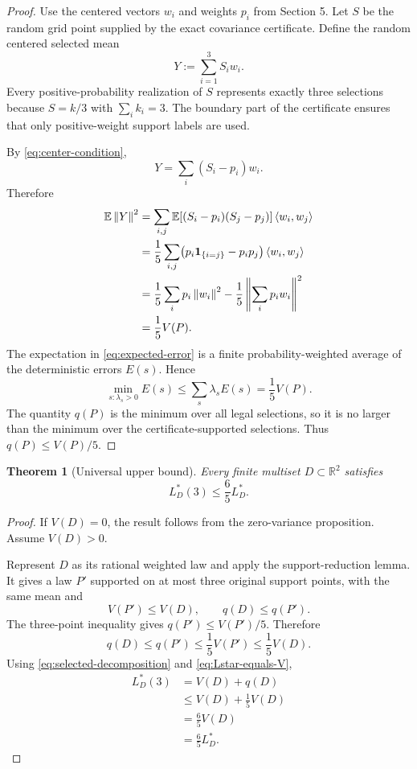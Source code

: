 \documentclass[11pt]{article}
\newtheorem{theorem}{Theorem}[section]
\theoremstyle{definition}
\theoremstyle{remark}
\newcommand{\R}{\mathbb{R}}
\newcommand{\E}{\mathbb{E}}
\newcommand{\ip}[2]{\left\langle #1,#2\right\rangle}
\newcommand{\norm}[1]{\left\lVert #1\right\rVert}
\begin{document}
\begin{proof}
Use the centered vectors $w_i$ and weights $p_i$ from Section 5.  Let $S$ be the random grid point supplied by the exact covariance certificate.  Define the random centered selected mean
\begin{equation}
Y:=\sum_{i=1}^3S_iw_i.
\label{eq:def-Y}
\end{equation}
Every positive-probability realization of $S$ represents exactly three selections because $S=k/3$ with $\sum_i k_i=3$.  The boundary part of the certificate ensures that only positive-weight support labels are used.

By \eqref{eq:center-condition},
\[
Y=\sum_i(S_i-p_i)w_i.
\]
Therefore
\begin{align}
\E\norm{Y}^2
&=\sum_{i,j}
\E[(S_i-p_i)(S_j-p_j)]\ip{w_i}{w_j} \notag\\
&=\frac15\sum_{i,j}
\bigl(p_i\mathbf 1_{\{i=j\}}-p_ip_j\bigr)\ip{w_i}{w_j} \notag\\
&=\frac15\sum_i p_i\norm{w_i}^2
 -\frac15\norm{\sum_i p_iw_i}^2 \notag\\
&=\frac15V(P).
\label{eq:expected-error}
\end{align}
The expectation in \eqref{eq:expected-error} is a finite probability-weighted average of the deterministic errors $E(s)$.  Hence
\[
\min_{s:\lambda_s>0}E(s)
\le\sum_s\lambda_sE(s)
=\frac15V(P).
\]
The quantity $q(P)$ is the minimum over all legal selections, so it is no larger than the minimum over the certificate-supported selections.  Thus $q(P)\le V(P)/5$.
\end{proof}

\begin{theorem}[Universal upper bound]
Every finite multiset $D\subset\R^2$ satisfies
\[
L_D^*(3)\le\frac65L_D^*.
\]
\end{theorem}

\begin{proof}
If $V(D)=0$, the result follows from the zero-variance proposition.  Assume $V(D)>0$.

Represent $D$ as its rational weighted law and apply the support-reduction lemma.  It gives a law $P'$ supported on at most three original support points, with the same mean and
\[
V(P')\le V(D),
\qquad
q(D)\le q(P').
\]
The three-point inequality gives $q(P')\le V(P')/5$.  Therefore
\begin{equation}
q(D)\le q(P')\le\frac15V(P')\le\frac15V(D).
\label{eq:upper-chain-final}
\end{equation}
Using \eqref{eq:selected-decomposition} and \eqref{eq:Lstar-equals-V},
\begin{align*}
L_D^*(3)
&=V(D)+q(D)\\
&\le V(D)+\frac15V(D)\\
&=\frac65V(D)\\
&=\frac65L_D^*.
\end{align*}
\end{proof}
\end{document}
